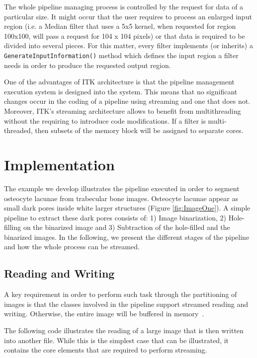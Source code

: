 \documentclass{InsightArticle}
\begin{document}
The whole pipeline managing process is controlled by the request for data of
a particular size. It might occur that the user requires to process an enlarged
input region (i.e. a Median filter that uses a 5x5 kernel, when requested for
region 100x100, will pass a request for 104 x 104 pixels) or that data is required
to be divided into several pieces. For this matter, every filter implements (or
inherits) a \verb+GenerateInputInformation()+ method which defines the input
region a filter needs in order to produce the requested output region.

One of the advantages of ITK architecture is that the pipeline management execution
system is designed into the system. This means that no significant changes occur
in the coding of a pipeline using streaming and one that does not. Moreover, ITK's
streaming architecture allows to benefit from multithreading without the requiring
to introduce code modifications. If a filter is multi-threaded, then subsets
of the memory block will be assigned to separate cores.

\section{Implementation}
\label{sec:implementation}
The example we develop illustrates the pipeline executed in order to segment
osteocyte lacunae from trabecular bone images. Osteocyte lacunae appear as small
dark pores inside white larger structures (Figure \ref{fig:ImageOne}). A simple pipeline
to extract these dark pores consists of: 1) Image binarization, 2)
Hole-filling on the binarized image and 3) Subtraction of the hole-filled and
the binarized images.  In the following, we present the different stages of the
pipeline and how the whole process can be streamed.

\subsection{Reading and Writing}
A key requirement in order to perform such task through the partitioning of
images is that the  classes involved in the pipeline support
streamed reading and writing. Otherwise, the entire image will be buffered
in memory~\cite{Lowekamp2010}.

The following code illustrates the reading of a large image that is then written
into another file. While this is the simplest case that can be illustrated, it
contains the core elements that are required to perform streaming.
\end{document}
